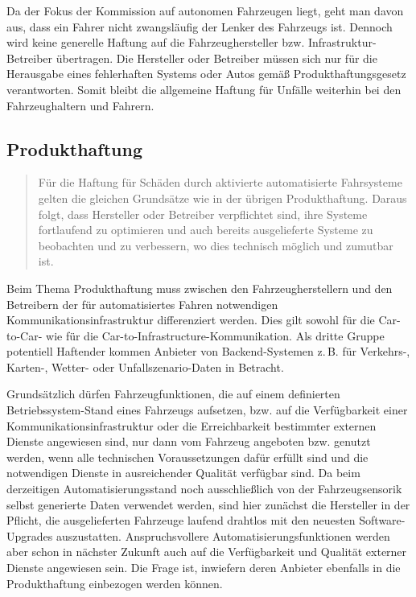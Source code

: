 \documentclass[twoside,a4paper,12pt]{article}
\begin{document}
Da der Fokus der Kommission auf autonomen Fahrzeugen liegt, geht man davon aus, dass ein Fahrer nicht zwangsläufig der Lenker des Fahrzeugs ist. Dennoch wird keine
generelle Haftung auf die Fahrzeughersteller bzw. Infrastruktur-Betreiber übertragen. Die Hersteller oder Betreiber müssen sich nur für die Herausgabe eines fehlerhaften Systems oder Autos gemäß Produkthaftungsgesetz verantworten. Somit bleibt die allgemeine Haftung für Unfälle weiterhin bei den Fahrzeughaltern und Fahrern.\\

\subsection{Produkthaftung} \label{Produkthaftung}

\begin{quote}
\glqq
Für die Haftung für Schäden durch aktivierte automatisierte Fahrsysteme gelten die gleichen Grundsätze wie in der übrigen 
Produkthaftung. Daraus folgt, dass Hersteller oder
Betreiber verpflichtet sind, ihre Systeme fortlaufend zu optimieren und auch bereits ausgelieferte Systeme zu beobachten und zu 
verbessern, wo dies technisch möglich und zumutbar ist.\grqq\mbox{~\cite[S. 12]{ek}}
\end{quote}

Beim Thema Produkthaftung muss zwischen den Fahrzeugherstellern und den Betreibern der für automatisiertes Fahren notwendigen
Kommunikationsinfrastruktur differenziert werden. Dies gilt sowohl für die Car-to-Car- wie für die Car-to-Infrastructure-Kommunikation.
Als dritte Gruppe potentiell Haftender kommen Anbieter von Backend-Systemen z.\,B. für Verkehrs-, Karten-, Wetter- oder Unfallszena\-rio-Daten 
in Betracht. 

Grundsätzlich dürfen Fahrzeugfunktionen, die auf einem definierten \glqq Betriebssys\-tem\grqq-Stand eines Fahrzeugs aufsetzen, bzw. auf die 
Verfügbarkeit einer Kommunikationsinfrastruktur oder die Erreichbarkeit bestimmter externen Dienste angewiesen sind, nur dann vom Fahrzeug 
angeboten bzw. genutzt werden, wenn alle technischen Voraussetzungen dafür erfüllt sind und die notwendigen Dienste in ausreichender 
Qualität verfügbar sind. Da beim derzeitigen Automatisierungsstand noch ausschließlich von der Fahrzeugsensorik selbst generierte Daten verwendet werden, 
sind hier zunächst die Hersteller in der Pflicht, die ausgelieferten Fahrzeuge laufend drahtlos mit den neuesten Software-Upgrades auszustatten.
Anspruchsvollere Automatisierungsfunktionen werden aber schon in nächster Zukunft auch auf die Verfügbarkeit und Qualität externer Dienste 
angewiesen sein. Die Frage ist, inwiefern deren Anbieter ebenfalls in die Produkthaftung einbezogen werden können.
\end{document}
